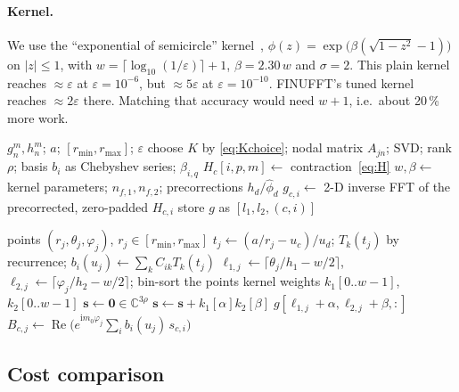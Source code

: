 \documentclass[11pt,a4paper]{article}
\theoremstyle{remark}
\newcommand{\eps}{\varepsilon}
\renewcommand{\Re}{\operatorname{Re}}
\begin{document}
\paragraph{Kernel.} We use the ``exponential of semicircle'' kernel~\cite{barnett2019},
$\phi(z)=\exp\big(\beta(\sqrt{1-z^2}-1)\big)$ on $|z|\le1$, with $w=\lceil\log_{10}(1/\eps)\rceil+1$,
$\beta=2.30\,w$ and $\sigma=2$. This plain kernel reaches $\approx\eps$ at $\eps=10^{-6}$, but $\approx5\eps$ at
$\eps=10^{-10}$. FINUFFT's tuned kernel reaches $\approx2\eps$ there. Matching that accuracy would need
$w+1$, i.e.\ about 20\,\% more work.

\begin{algorithm}[!htbp]
\caption{2-D variant: precomputation}\label{alg:pre2d}
\begin{algorithmic}[1]
\Require $g_n^m,h_n^m$; $a$; $[r_{\min},r_{\max}]$; $\eps$
\State choose $K$ by \eqref{eq:Kchoice}; nodal matrix $A_{jn}$; SVD; rank $\rho$; basis $b_i$ as Chebyshev series; $\beta_{i,q}$
\State $H_c[i,p,m]\gets$ contraction~\eqref{eq:H} 
\State $w,\beta\gets$ kernel parameters; $n_{f,1},n_{f,2}$; precorrections $h_d/\hat\phi_d$
\State $g_{c,i}\gets$ 2-D inverse FFT of the precorrected, zero-padded $H_{c,i}$ 
\State store $g$ as $[l_1,l_2,(c,i)]$
\end{algorithmic}
\end{algorithm}

\begin{algorithm}[!htbp]
\caption{2-D variant: evaluation at $M$ points}\label{alg:eval2d}
\begin{algorithmic}[1]
\Require points $(r_j,\theta_j,\varphi_j)$, $r_j\in[r_{\min},r_{\max}]$
\State $t_j\gets(a/r_j-u_c)/u_d$; $T_k(t_j)$ by recurrence; $b_i(u_j)\gets\sum_kC_{ik}T_k(t_j)$
\State $\ell_{1,j}\gets\lceil\theta_j/h_1-w/2\rceil$, $\ell_{2,j}\gets\lceil\varphi_j/h_2-w/2\rceil$; bin-sort the points
  \State kernel weights $k_1[0..w-1]$, $k_2[0..w-1]$
  \State $\mathbf s\gets\mathbf0\in\mathbb C^{3\rho}$
   \State $\mathbf s\gets\mathbf s+k_1[\alpha]k_2[\beta]\;g[\ell_{1,j}+\alpha,\ell_{2,j}+\beta,:]$ 
  \EndFor
  \State $B_{c,j}\gets\Re\big(e^{\mathrm im_0\varphi_j}\sum_ib_i(u_j)\,s_{c,i}\big)$
\EndFor
\end{algorithmic}
\end{algorithm}

\subsection{Cost comparison}
\end{document}

